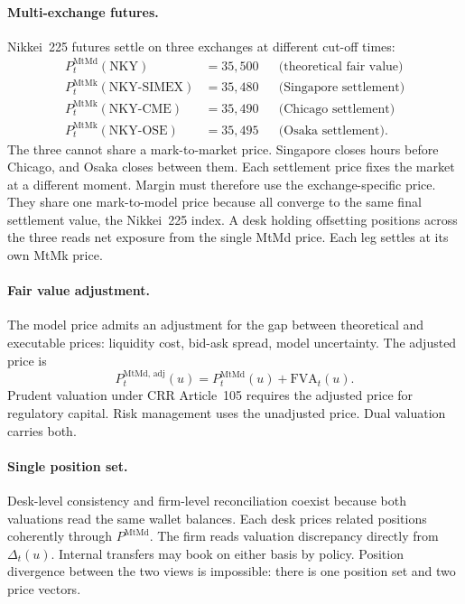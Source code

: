 \paragraph{Multi-exchange futures.} Nikkei~225 futures settle on three exchanges at different cut-off times:
\begin{align*}
P_t^{\text{MtMd}}(\text{NKY}) &= 35{,}500 && \text{(theoretical fair value)}\\
P_t^{\text{MtMk}}(\text{NKY-SIMEX}) &= 35{,}480 && \text{(Singapore settlement)}\\
P_t^{\text{MtMk}}(\text{NKY-CME}) &= 35{,}490 && \text{(Chicago settlement)}\\
P_t^{\text{MtMk}}(\text{NKY-OSE}) &= 35{,}495 && \text{(Osaka settlement)}.
\end{align*}
The three cannot share a mark-to-market price. Singapore closes hours before Chicago, and Osaka closes between them. Each settlement price fixes the market at a different moment. Margin must therefore use the exchange-specific price. They share one mark-to-model price because all converge to the same final settlement value, the Nikkei~225 index. A desk holding offsetting positions across the three reads net exposure from the single MtMd price. Each leg settles at its own MtMk price.

\paragraph{Fair value adjustment.} The model price admits an adjustment for the gap between theoretical and executable prices: liquidity cost, bid-ask spread, model uncertainty. The adjusted price is
\[
P_t^{\text{MtMd, adj}}(u) = P_t^{\text{MtMd}}(u) + \text{FVA}_t(u).
\]
Prudent valuation under CRR Article~105 requires the adjusted price for regulatory capital. Risk management uses the unadjusted price. Dual valuation carries both.

\paragraph{Single position set.} Desk-level consistency and firm-level reconciliation coexist because both valuations read the same wallet balances. Each desk prices related positions coherently through $P^{\text{MtMd}}$. The firm reads valuation discrepancy directly from $\Delta_t(u)$. Internal transfers may book on either basis by policy. Position divergence between the two views is impossible: there is one position set and two price vectors.

